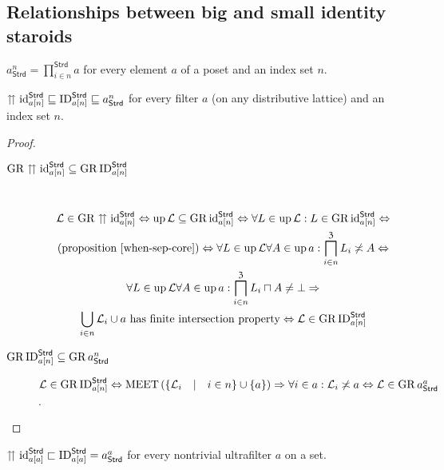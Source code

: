 \subsection{Relationships between big and small identity staroids}
\begin{defn}
$a_{\mathsf{Strd}}^{n}=\prod_{i\in n}^{\mathsf{Strd}}a$ for every
element $a$ of a poset and an index set $n$.\end{defn}
\begin{prop}
$\upuparrows\operatorname{id}_{a[n]}^{\mathsf{Strd}}\sqsubseteq\operatorname{ID}_{a[n]}^{\mathsf{Strd}}\sqsubseteq a_{\mathsf{Strd}}^{n}$
for every filter $a$ (on any distributive lattice) and an index set
$n$.\end{prop}
\begin{proof}
~
\begin{description}
\item [{$\operatorname{GR}\upuparrows\operatorname{id}_{a[n]}^{\mathsf{Strd}}\subseteq\operatorname{GR}\operatorname{ID}_{a[n]}^{\mathsf{Strd}}$}] ~
\begin{multline*}
\mathcal{L}\in\operatorname{GR}\upuparrows\operatorname{id}_{a[n]}^{\mathsf{Strd}}\Leftrightarrow\operatorname{up}\mathcal{L}\subseteq\operatorname{GR}\operatorname{id}_{a[n]}^{\mathsf{Strd}}\Leftrightarrow\forall L\in\operatorname{up}\mathcal{L}:L\in\operatorname{GR}\operatorname{id}_{a[n]}^{\mathsf{Strd}}\Leftrightarrow\\
\text{(proposition \ref{when-sep-core})}\Leftrightarrow\forall L\in\operatorname{up}\mathcal{L}\forall A\in\operatorname{up} a:\bigsqcap_{i\in n}^{\mathfrak{Z}}L_{i}\not\asymp A\Leftrightarrow\\
\forall L\in\operatorname{up}\mathcal{L}\forall A\in\operatorname{up} a:\bigsqcap_{i\in n}^{\mathfrak{Z}}L_{i}\sqcap A\neq\bot\Rightarrow\\
\bigcup_{i\in n}\mathcal{L}_{i}\cup a\text{ has finite intersection property}\Leftrightarrow\mathcal{L}\in\operatorname{GR}\operatorname{ID}_{a[n]}^{\mathsf{Strd}}
\end{multline*}

\item [{$\operatorname{GR}\operatorname{ID}_{a[n]}^{\mathsf{Strd}}\subseteq\operatorname{GR} a_{\mathsf{Strd}}^{n}$}] $\mathcal{L}\in\operatorname{GR}\operatorname{ID}_{a[n]}^{\mathsf{Strd}}\Leftrightarrow\operatorname{MEET}\left(\left\{ \mathcal{L}_{i}\hspace{1em}|\hspace{1em}i\in n\right\} \cup\{a\}\right)\Rightarrow\forall i\in a:\mathcal{L}_{i}\not\asymp a\Leftrightarrow\mathcal{L}\in\operatorname{GR} a_{\mathsf{Strd}}^{a}$.
\end{description}
\end{proof}
\begin{prop}
$\upuparrows\operatorname{id}_{a[a]}^{\mathsf{Strd}}\sqsubset\operatorname{ID}_{a[a]}^{\mathsf{Strd}}=a_{\mathsf{Strd}}^{a}$
for every nontrivial ultrafilter $a$ on a set.\end{prop}
